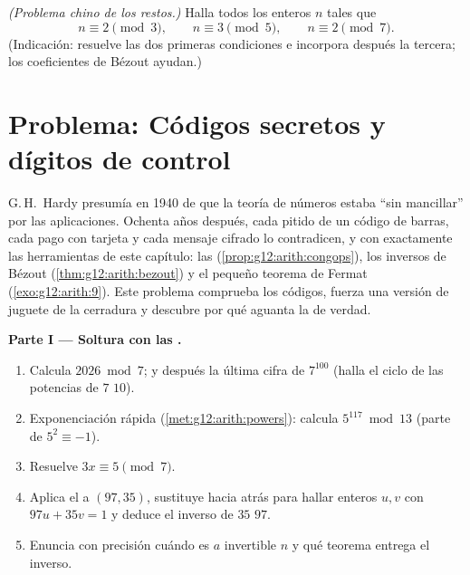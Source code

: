 \begin{exercise}[$\star\star\star$]\label{exo:g12:arith:10}
\emph{(Problema chino de los restos.)} Halla todos los enteros $n$ tales
que
\[
n \equiv 2 \pmod 3, \qquad n \equiv 3 \pmod 5, \qquad n \equiv 2 \pmod 7 .
\]
(Indicación: resuelve las dos primeras condiciones e incorpora después la
tercera; los coeficientes de Bézout ayudan.)
\end{exercise}

\section{Problema: Códigos secretos y dígitos de control}

\begin{problem}
\label{pb:g12:arith:1}
G.\,H.~Hardy presumía en 1940 de que la teoría de números estaba ``sin
mancillar'' por las aplicaciones. Ochenta años después, cada pitido de un
código de barras, cada pago con tarjeta y cada mensaje cifrado lo
contradicen, y con exactamente las herramientas de este capítulo: las
 (\cref{prop:g12:arith:congops}), los inversos de Bézout
(\cref{thm:g12:arith:bezout}) y el pequeño teorema de Fermat
(\cref{exo:g12:arith:9}). Este problema comprueba los códigos, fuerza una
versión de juguete de la cerradura y descubre por qué aguanta la de
verdad.

\medskip
\noindent\textbf{Parte I --- Soltura con las .}
\begin{enumerate}
  \item Calcula $2026 \bmod 7$; y después la última cifra de $7^{100}$
        (halla el ciclo de las potencias de $7$  $10$).
  \item Exponenciación rápida (\cref{met:g12:arith:powers}): calcula
        $5^{117} \bmod 13$ (parte de $5^2 \equiv -1$).
  \item Resuelve $3x \equiv 5 \pmod 7$.
  \item Aplica el  a $(97, 35)$, sustituye hacia atrás
        para hallar enteros $u, v$ con $97u + 35v = 1$ y deduce el inverso
        de $35$  $97$.
  \item Enuncia con precisión cuándo es $a$ invertible  $n$ y qué
        teorema entrega el inverso.
\end{enumerate}


\end{problem}
